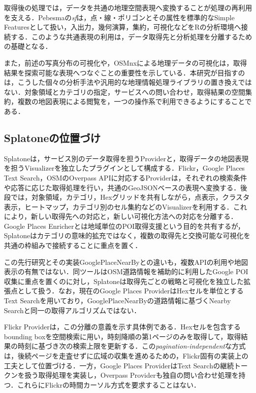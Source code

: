 取得後の処理では，データを共通の地理空間表現へ変換することが処理の再利用を支える．Pebesmaの\textit{sf}は，点・線・ポリゴンとその属性を標準的なSimple Featuresとして扱い，入出力，幾何演算，集約，可視化などをRの分析環境へ接続する\cite{pebesma2018sf}．このような共通表現の利用は，データ取得先と分析処理を分離するための基礎となる．

また，前述の写真分布の可視化\cite{kisilevich2010eventbased,kadar2013wheredotouristsgo}や，OSMnxによる地理データの可視化\cite{boeing2017osmnx}は，取得結果を探索可能な表現へつなぐことの重要性を示している．本研究が目指すのは，こうした個々の分析手法や汎用的な地理情報処理ライブラリの置き換えではない．対象領域とカテゴリの指定，サービスへの問い合わせ，取得結果の空間集約，複数の地図表現による閲覧を，一つの操作系で利用できるようにすることである．

\subsection{Splatoneの位置づけ}

Splatoneは，サービス別のデータ取得を担うProviderと，取得データの地図表現を担うVisualizerを独立したプラグインとして構成する．Flickr，Google Places Text Search，OSMのOverpass APIに対応するProviderは，それぞれの検索条件や応答に応じた取得処理を行い，共通のGeoJSONベースの表現へ変換する．後段では，対象領域，カテゴリ，Hexグリッドを共有しながら，点表示，クラスタ表示，ヒートマップ，カテゴリ別のセル集約などのVisualizerを利用する．これにより，新しい取得先への対応と，新しい可視化方法への対応を分離する．Google Places Enricherとは地域単位のPOI取得支援という目的を共有するが，Splatoneはカテゴリの意味的拡充ではなく，複数の取得先と交換可能な可視化を共通の枠組みで接続することに重点を置く\cite{gubert2022placesenricher}．

この先行研究とその実装GooglePlaceNearBy\cite{yokoyama2019efficientcrawling,yokoyama2020googleplacenearby}との違いも，複数APIの利用や地図表示の有無ではない．同ツールはOSM道路情報を補助的に利用したGoogle POI収集に重点を置くのに対し，Splatoneは取得先ごとの戦略と可視化を独立した拡張点として扱う．なお，現在のGoogle Places ProviderはHexセルを単位とするText Searchを用いており，GooglePlaceNearByの道路情報に基づくNearby Searchと同一の取得アルゴリズムではない．

Flickr Providerは，この分離の意義を示す具体例である．Hexセルを包含するbounding boxを空間検索に用い，時刻降順の第1ページのみを取得して，取得結果の時刻に基づき次の検索上限を更新する．この\textit{pagination-independent}な方式は，後続ページを走査せずに広域の収集を進めるための，Flickr固有の実装上の工夫として位置づける．一方，Google Places ProviderはText Searchの継続トークンを扱う取得処理を実装し，Overpass Providerも独自の問い合わせ処理を持つ．これらにFlickrの時間カーソル方式を要求することはない．

